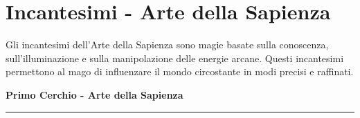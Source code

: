 \documentclass[./magie.tex]{subfiles}
\begin{document}
\section{Incantesimi - Arte della Sapienza}

Gli incantesimi dell'Arte della Sapienza sono magie basate sulla conoscenza, sull'illuminazione e sulla manipolazione delle energie arcane. Questi incantesimi permettono al mago di influenzare il mondo circostante in modi precisi e raffinati.

\vspace{0.4cm}
{\zarafirtitlefont\Large\bfseries Primo Cerchio - Arte della Sapienza}

\vspace{0.2cm}
\noindent
\begin{center}
\rule{\textwidth}{0.4pt} 
\end{center}
\vspace{0.2cm}
\end{document}
